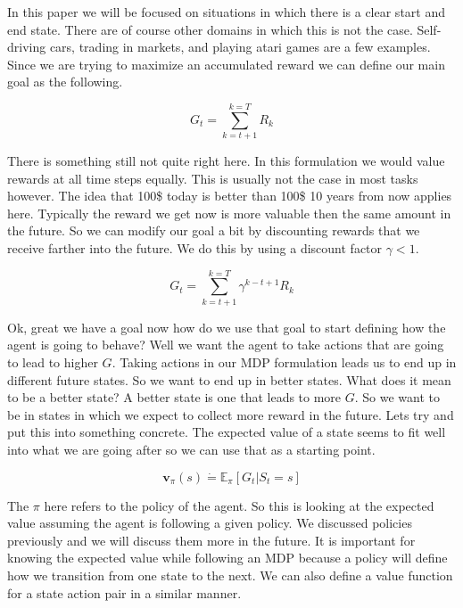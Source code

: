 In this paper we will be focused on situations in which there is a clear start and end state. There are of course other domains in which this is not the case. Self-driving cars, trading in markets, and playing atari games are a few examples. Since we are trying to maximize an accumulated reward we can define our main goal as the following. 

\begin{equation}\label{Cumulative sum}
 G_{t} = \sum_{k=t + 1}^{k=T} R_{k}
\end{equation}

There is something still not quite right here. In this formulation we would value rewards at all time steps equally. This is usually not the case in most tasks however. The idea that 100\$ today is better than 100\$ 10 years from now applies here. Typically the reward we get now is more valuable then the same amount in the future. So we can modify our goal a bit by discounting rewards that we receive farther into the future. We do this by using a discount factor $\gamma < 1$. 

\begin{equation}\label{Discounted Cumulative Sum}
G_{t} = \sum_{k=t + 1}^{k=T} \gamma^{k - t + 1} R_{k}
\end{equation}

Ok, great we have a goal now how do we use that goal to start defining how the agent is going to behave? Well we want the agent to take actions that are going to lead to higher $G$. Taking actions in our MDP formulation leads us to end up in different future states. So we want to end up in better states. What does it mean to be a better state? A better state is one that leads to more $G$. So we want to be in states in which we expect to collect more reward in the future. Lets try and put this into something concrete. The expected value of a state seems to fit well into what we are going after so we can use that as a starting point. 

\begin{equation}\label{Expected State Value}
\mathbf{v}_{\pi}(s) \dot{=} \mathbb{E}_{\pi}[G_{t} | S_{t} = s]
\end{equation}

The $\pi$ here refers to the policy of the agent. So this is looking at the expected value assuming the agent is following a given policy. We discussed policies previously and we will discuss them more in the future. It is important for knowing the expected value while following an MDP because a policy will define how we transition from one state to the next. We can also define a value function for a state action pair in a similar manner. 

